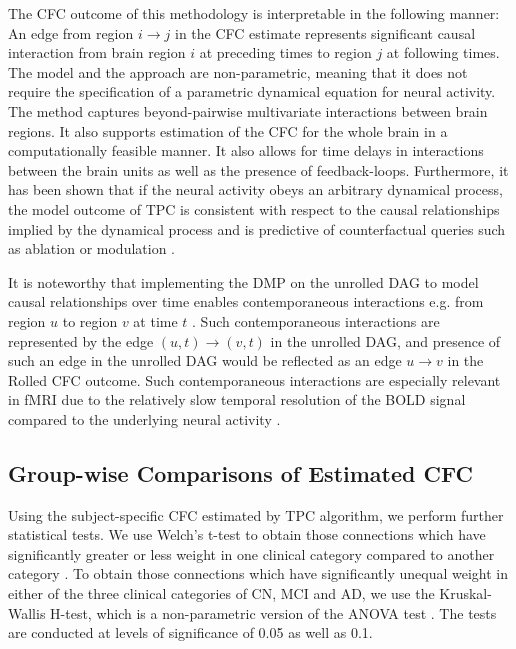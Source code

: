 \documentclass[12pt,reqno]{amsart}
\theoremstyle{definition}
\begin{document}
The CFC outcome of this methodology is interpretable in the following manner: An edge from region $i\rightarrow j$ in the CFC estimate represents significant causal interaction from brain region $i$ at preceding times to region $j$ at following times. The model and the approach are non-parametric, meaning that it does not require the specification of a parametric dynamical equation for neural activity. The method captures beyond-pairwise multivariate interactions between brain regions. It also supports estimation of the CFC for the whole brain in a computationally feasible manner. It also allows for time delays in interactions between the brain units as well as the presence of feedback-loops. Furthermore, it has been shown that if the neural activity obeys an arbitrary dynamical process, the model outcome of TPC is consistent with respect to the causal relationships implied by the dynamical process and is predictive of counterfactual queries such as ablation or modulation \citep{biswas2022statistical2}.

It is noteworthy that implementing the DMP on the unrolled DAG to model causal relationships over time enables contemporaneous interactions e.g. from region $u$ to region $v$ at time $t$ \citep{biswas2022statistical2}. Such contemporaneous interactions are represented by the edge $(u,t)\rightarrow (v,t)$ in the unrolled DAG, and presence of such an edge in the unrolled DAG would be reflected as an edge $u\rightarrow v$ in the Rolled CFC outcome. Such contemporaneous interactions are especially relevant in fMRI due to the relatively slow temporal resolution of the BOLD signal compared to the underlying neural activity \citep{smith2011network}. 



\subsection{Group-wise Comparisons of Estimated CFC}
Using the subject-specific CFC estimated by TPC algorithm, we perform further statistical tests. We use Welch's t-test to obtain those connections which have significantly greater or less weight in one clinical category compared to another category \citep{yuen1974two}. To obtain those connections which have significantly unequal weight in either of the three clinical categories of CN, MCI and AD, we use the Kruskal-Wallis H-test, which is a non-parametric version of the ANOVA test \citep{kruskal1952use}. The tests are conducted at levels of significance of 0.05 as well as 0.1.
\end{document}
